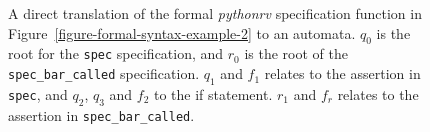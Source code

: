 \begin{figure}[h!]
\begin{minipage}{0.9\textwidth}
	\end{minipage}
  \caption{A direct translation of the formal \textit{pythonrv} specification
    function in Figure~\ref{figure-formal-syntax-example-2} to an automata.
    $q_0$ is the root for the \texttt{spec} specification, and $r_0$ is the
    root of the \texttt{spec\_bar\_called} specification. $q_1$ and $f_1$
    relates to the assertion in \texttt{spec}, and $q_2$, $q_3$ and $f_2$ to
    the if statement. $r_1$ and $f_r$ relates to the assertion in
    \texttt{spec\_bar\_called}.}
	\label{figure-formal-syntax-example-2-automata}
\end{figure}

